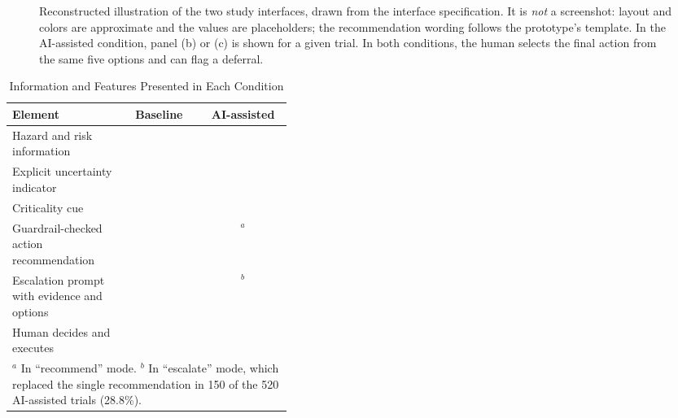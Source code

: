 \documentclass[journal]{IEEEtran}
\newcommand{\cmark}{\ding{51}}
\newcommand{\xmark}{\ding{55}}
\providecommand{\cmark}{\ding{51}}
\providecommand{\xmark}{\ding{55}}
\theoremstyle{plain}
\theoremstyle{definition}
\providecommand{\cmark}{\ding{51}}
\providecommand{\xmark}{\ding{55}}
\begin{document}
\begin{figure}[t]
        \caption{Reconstructed illustration of the two study interfaces, drawn from the interface specification. It is \emph{not} a screenshot: layout and colors are approximate and the values are placeholders; the recommendation wording follows the prototype's template. In the AI-assisted condition, panel (b) or (c) is shown for a given trial. In both conditions, the human selects the final action from the same five options and can flag a deferral.}
        \label{fig:interfaces}
    \end{figure}

    \begin{table}[t]
        \caption{Information and Features Presented in Each Condition}
        \label{tab:conditions}
        \centering
        \begin{tabular}{p{0.40\linewidth}cc}
            \toprule
            \textbf{Element} & \textbf{Baseline} & \textbf{AI-assisted} \\
            \midrule
            Hazard and risk information & \cmark & \cmark \\
            Explicit uncertainty indicator & \xmark & \cmark \\
            Criticality cue & \xmark & \cmark \\
            Guardrail-checked action recommendation & \xmark & \cmark$^{a}$ \\
            Escalation prompt with evidence and options & \xmark & \cmark$^{b}$ \\
            Human decides and executes & \cmark & \cmark \\
            \bottomrule
            \multicolumn{3}{p{0.93\linewidth}}{\footnotesize $^{a}$ In ``recommend'' mode. $^{b}$ In ``escalate'' mode, which replaced the single recommendation in 150 of the 520 AI-assisted trials (28.8\%).}
        \end{tabular}
    \end{table}
\end{document}
